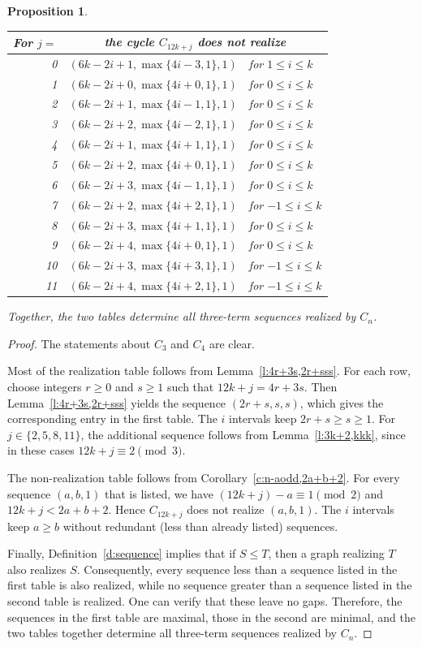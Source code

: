 \documentclass{article}
\newtheorem{proposition}[theorem]{Proposition}
\theoremstyle{definition}
\begin{document}
\begin{proposition}
\begin{tabular}{r|ll}
\hline
For $j=$&\multicolumn{2}{c}{the cycle $C_{12k+j}$ does not realize}\\
\hline
0&$(6k-2i+1,\max\{4i-3,1\},1)$&for $1\leq i\leq k$\\
1&$(6k-2i+0,\max\{4i+0,1\},1)$&for $0\leq i\leq k$\\
2&$(6k-2i+1,\max\{4i-1,1\},1)$&for $0\leq i\leq k$\\
3&$(6k-2i+2,\max\{4i-2,1\},1)$&for $0\leq i\leq k$\\
4&$(6k-2i+1,\max\{4i+1,1\},1)$&for $0\leq i\leq k$\\
5&$(6k-2i+2,\max\{4i+0,1\},1)$&for $0\leq i\leq k$\\
6&$(6k-2i+3,\max\{4i-1,1\},1)$ &for $0\leq i\leq k$\\
7&$(6k-2i+2,\max\{4i+2,1\},1)$&for $-1\leq i\leq k$\\
8&$(6k-2i+3,\max\{4i+1,1\},1)$&for $0\leq i\leq k$\\
9&$(6k-2i+4,\max\{4i+0,1\},1)$&for $0\leq i\leq k$\\
10&$(6k-2i+3,\max\{4i+3,1\},1)$&for $-1\leq i\leq k$\\
11&$(6k-2i+4,\max\{4i+2,1\},1)$&for $-1\leq i\leq k$\\
\hline
\end{tabular}

\bigskip

\noindent Together, the two tables determine all
three-term sequences realized by $C_n$.
\end{proposition}

\begin{proof}
The statements about $C_3$ and $C_4$ are clear.

Most of the realization table follows from Lemma~\ref{l:4r+3s,2r+sss}.
For each row, choose integers $r\ge 0$ and $s\ge 1$ such that $12k+j=4r+3s$.
Then Lemma~\ref{l:4r+3s,2r+sss} yields the sequence $(2r+s,s,s)$, which gives the corresponding entry in the first table. 
The $i$ intervals keep $2r+s\geq s\geq1$.
For $j\in\{2,5,8,11\}$, the additional sequence follows from Lemma~\ref{l:3k+2,kkk}, since in these cases $12k+j\equiv2\pmod 3$.

The non-realization table follows from Corollary~\ref{c:n-aodd,2a+b+2}.
For every sequence $(a,b,1)$ that is listed, we have $(12k+j)-a\equiv1\pmod 2$ and $12k+j<2a+b+2$. Hence $C_{12k+j}$ does not realize $(a,b,1)$.
The $i$ intervals keep $a\geq b$ without redundant (less than already listed) sequences.

Finally, 
Definition~\ref{d:sequence}
implies that if $S\leq T$, then a graph realizing $T$ also realizes $S$. Consequently, every sequence less than a sequence listed in the first table is also realized, while no sequence greater than a sequence listed in the second table is realized. 
One can verify that these leave no gaps.
Therefore, the sequences in the first table are maximal, those in the second are minimal, and the two tables together determine all
three-term sequences realized by $C_n$.
\end{proof}
\end{document}
